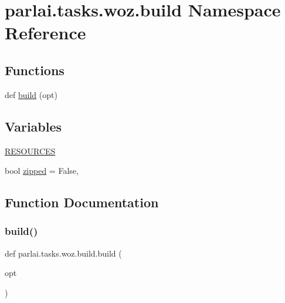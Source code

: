 \hypertarget{namespaceparlai_1_1tasks_1_1woz_1_1build}{}\section{parlai.\+tasks.\+woz.\+build Namespace Reference}
\label{namespaceparlai_1_1tasks_1_1woz_1_1build}
\subsection*{Functions}
\begin{DoxyCompactItemize}
\item 
def \hyperlink{namespaceparlai_1_1tasks_1_1woz_1_1build_ab38bcd37eac166f65dd77a51c0d8e934}{build} (opt)
\end{DoxyCompactItemize}
\subsection*{Variables}
\begin{DoxyCompactItemize}
\item 
\hyperlink{namespaceparlai_1_1tasks_1_1woz_1_1build_a5cef39ffd42686f4cc8c6a5e5fa120e2}{R\+E\+S\+O\+U\+R\+C\+ES}
\item 
bool \hyperlink{namespaceparlai_1_1tasks_1_1woz_1_1build_a8c08fd88da87be20522e5e4f4c6b82ec}{zipped} = False,
\end{DoxyCompactItemize}


\subsection{Function Documentation}
\mbox{\label{namespaceparlai_1_1tasks_1_1woz_1_1build_ab38bcd37eac166f65dd77a51c0d8e934}} 
\subsubsection{\texorpdfstring{build()}{build()}}
{\footnotesize\ttfamily def parlai.\+tasks.\+woz.\+build.\+build (\begin{DoxyParamCaption}\item[{}]{opt }\end{DoxyParamCaption})}



